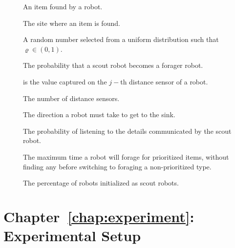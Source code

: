 \begin{description}
	\item[\parbox{\namewidth}{$\vartheta$}] An item found by a robot.
	\item[\parbox{\namewidth}{$\xi$}] The site where an item is found.

	\item[\parbox{\namewidth}{$\varrho$}] A random number selected from a uniform distribution such that $\varrho\in(0,1)$.
	
	\item[\parbox{\namewidth}{$\rho$}] The probability that a scout robot becomes a forager robot.
	
\item[\parbox{\namewidth}{$k_j$}] is the value captured on the $j-$th distance sensor of a robot.

\item[\parbox{\namewidth}{$n$}] The number of distance sensors.

\item[\parbox{\namewidth}{$d$}] The direction a robot must take to get to the sink.

\item[\parbox{\namewidth}{$\alpha$}] The probability of listening to the details communicated by the scout robot.		

\item[\parbox{\namewidth}{$f_{max}$}] The maximum time a robot will forage for prioritized items, without finding any before switching to foraging a non-prioritized type.

\item[\parbox{\namewidth}{$X$}] The percentage of robots initialized as scout robots.
\end{description}


\section{Chapter~\ref{chap:experiment}: Experimental Setup}
\label{sec:symbols:foraging}


